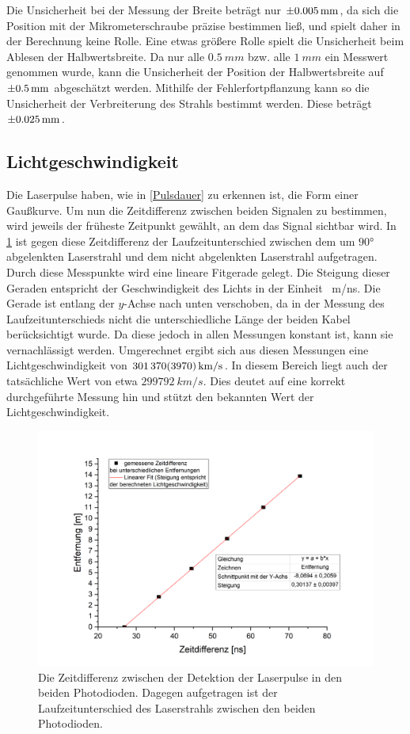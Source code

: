 \documentclass[
	a4paper,
	12pt,
	pagesize,
	ngerman
]{scrartcl}
\begin{document}
Die Unsicherheit bei der Messung der Breite beträgt nur $\SI{\pm0,005}{mm}$, da sich die Position mit der Mikrometerschraube präzise bestimmen ließ, und spielt daher in der Berechnung keine Rolle. Eine etwas größere Rolle spielt die Unsicherheit beim Ablesen der Halbwertsbreite. Da nur alle $\SI{0,5}{mm}$ bzw. alle $\SI{1}{mm}$ ein Messwert genommen wurde, kann die Unsicherheit der Position der Halbwertsbreite auf $\SI{\pm0,5}{mm}$ abgeschätzt werden. Mithilfe der Fehlerfortpflanzung kann so die Unsicherheit der Verbreiterung des Strahls bestimmt werden. Diese beträgt $\SI{\pm0,025}{mm}$.

\subsection{Lichtgeschwindigkeit}
Die Laserpulse haben, wie in \cref{Pulsdauer} zu erkennen ist, die Form einer Gaußkurve. Um nun die Zeitdifferenz zwischen beiden Signalen zu bestimmen, wird jeweils der früheste Zeitpunkt gewählt, an dem das Signal sichtbar wird. In \cref{lichtgeschwindigkeit} ist gegen diese Zeitdifferenz der Laufzeitunterschied zwischen dem um $90$° abgelenkten Laserstrahl und dem nicht abgelenkten Laserstrahl aufgetragen. Durch diese Messpunkte wird eine lineare Fitgerade gelegt. Die Steigung dieser Geraden entspricht der Geschwindigkeit des Lichts in der Einheit \SI{}{m/ns}. Die Gerade ist entlang der $y$-Achse nach unten verschoben, da in der Messung des Laufzeitunterschieds nicht die unterschiedliche Länge der beiden Kabel berücksichtigt wurde. Da diese jedoch in allen Messungen konstant ist, kann sie vernachlässigt werden. Umgerechnet ergibt sich aus diesen Messungen eine Lichtgeschwindigkeit von $\SI{301370\pm3970}{km/s}$. In diesem Bereich liegt auch der tatsächliche Wert von etwa $\SI{299 792}{km/s}$. Dies deutet auf eine korrekt durchgeführte Messung hin und stützt den bekannten Wert der Lichtgeschwindigkeit.

\begin{figure}[ht!]
	\centering
	\includegraphics[scale=0.6]{lichtgeschwindigkeit.png}
	\caption{Die Zeitdifferenz zwischen der Detektion der Laserpulse in den beiden Photodioden. Dagegen aufgetragen ist der Laufzeitunterschied des Laserstrahls zwischen den beiden Photodioden.}
	\label{lichtgeschwindigkeit}
\end{figure}
\end{document}
